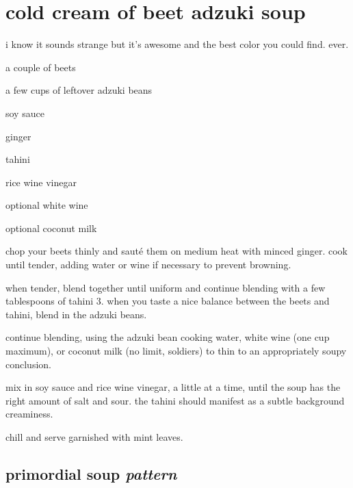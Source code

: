 \section{cold cream of beet adzuki soup}

i know it sounds strange but it's awesome and the best color you could
find. ever.

\begin{ingredients}
  \item a couple of beets
  \item a few cups of leftover adzuki beans
  \item soy sauce
  \item ginger
  \item tahini
  \item rice wine vinegar\\

  \item optional white wine
  \item optional coconut milk
\end{ingredients}

\begin{algorithm}
  \item chop your beets thinly and saut\'{e} them on medium heat with
  minced ginger. cook until tender, adding water or wine if necessary
  to prevent browning.

  \item when tender, blend together until uniform and continue
  blending with a few tablespoons of tahini 3. when you taste a nice
  balance between the beets and tahini, blend in the adzuki beans.

  \item continue blending, using the adzuki bean cooking water, white
  wine (one cup maximum), or coconut milk (no limit, soldiers) to thin
  to an appropriately soupy conclusion.

  \item mix in soy sauce and rice wine vinegar, a little at a time,
  until the soup has the right amount of salt and sour. the tahini
  should manifest as a subtle background creaminess.

  \item chill and serve garnished with mint leaves.
\end{algorithm}

\subsection{primordial soup \textit{pattern}}

